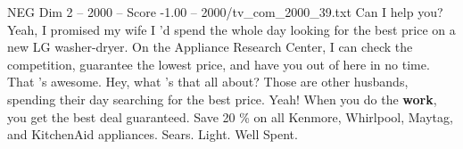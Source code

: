 \begin{textsample}{NEG Dim 2 – 2000 – Score -1.00 – 2000/tv\_com\_2000\_39.txt}  \label{ex:f2_neg_019}
Can I help you?
Yeah, I promised my wife I 'd spend the whole day looking for the best price on a new LG washer-dryer.
On the Appliance Research Center, I can check the competition, guarantee the lowest price, and have you out of here in no time.
That 's awesome.
Hey, what 's that all about?
Those are other husbands, spending their day searching for the best price.
Yeah!
When you do the \textbf{work}, you get the best deal guaranteed.
Save 20 \% on all Kenmore, Whirlpool, Maytag, and KitchenAid appliances.
Sears.
Light.
Well Spent.

\end{textsample}
